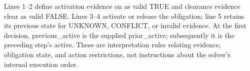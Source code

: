 \documentclass[nolineno]{ieeeaccess}
\begin{document}
\par\smallskip\noindent{}\par\smallskip

Lines 1--2 define activation evidence {\ttfamily{}\selectfont\footnotesize on} as valid TRUE and clearance evidence {\ttfamily{}\selectfont\footnotesize clear} as valid FALSE. Lines 3--4 activate or release the obligation; line 5 retains its previous state for UNKNOWN, CONFLICT, or invalid evidence. At the first decision, {\ttfamily{}\selectfont\footnotesize previous\_\allowbreak active} is the supplied {\ttfamily{}\selectfont\footnotesize prior\_\allowbreak active}; subsequently it is the preceding step's {\ttfamily{}\selectfont\footnotesize active}. These are interpretation rules relating evidence, obligation state, and action restrictions, not instructions about the solver's internal execution order.\par
\end{document}
